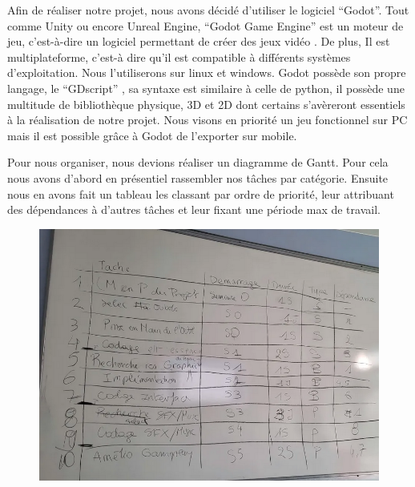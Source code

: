 \documentclass{article}
\begin{document}
Afin de réaliser notre projet, nous avons décidé d’utiliser le logiciel “Godot”. Tout comme Unity ou encore Unreal Engine, “Godot Game Engine” est un moteur de jeu, c'est-à-dire un logiciel permettant de créer des jeux vidéo .
De plus, Il est multiplateforme, c'est-à dire qu’il est compatible à différents systèmes d'exploitation. Nous l’utiliserons sur linux et windows.
Godot possède son propre langage, le “GDscript” , sa syntaxe est similaire à celle de python, il possède une multitude de bibliothèque physique, 3D et 2D
dont certains s'avèreront essentiels à la réalisation de notre projet.
Nous visons en priorité un jeu fonctionnel sur PC mais il est possible grâce à Godot de l'exporter sur mobile. \par
\vspace{10pt}
\noindent Pour nous organiser, nous devions réaliser un diagramme de Gantt. Pour cela nous avons d’abord en présentiel rassembler nos tâches par catégorie. Ensuite nous en avons fait un tableau les classant par ordre de priorité, leur attribuant des dépendances à d’autres tâches et leur fixant une période max de travail.

\begin{figure}[h]
    \centering
    \includegraphics[width=1\textwidth]{tableau_pour_gantt.png}
    \label{fig:tableau_pour_gantt.png}
\end{figure}

\newpage
\end{document}
